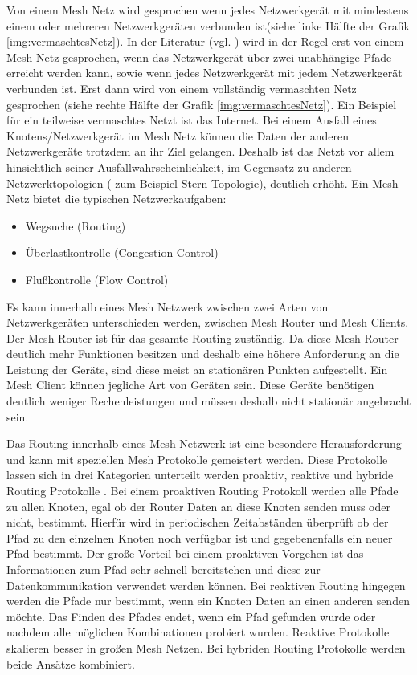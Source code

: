 Von einem Mesh Netz wird gesprochen wenn jedes Netzwerkgerät mit mindestens einem oder mehreren Netzwerkgeräten verbunden ist(siehe linke Hälfte der Grafik \ref{img:vermaschtesNetz}). In der Literatur (vgl. \cite{ conrads2013datenkommunikation}) wird in der Regel erst von einem Mesh Netz gesprochen, wenn das Netzwerkgerät über zwei unabhängige Pfade erreicht werden kann, sowie  wenn jedes Netzwerkgerät mit jedem Netzwerkgerät verbunden ist.  Erst dann wird von einem vollständig vermaschten Netz gesprochen (siehe rechte Hälfte der Grafik \ref{img:vermaschtesNetz}). Ein Beispiel für ein teilweise vermaschtes Netzt ist das Internet. 
Bei einem Ausfall eines Knotens/Netzwerkgerät im Mesh Netz können die Daten der anderen Netzwerkgeräte trotzdem an ihr Ziel gelangen. Deshalb ist das Netzt vor allem hinsichtlich seiner Ausfallwahrscheinlichkeit, im Gegensatz zu anderen Netzwerktopologien ( zum Beispiel Stern-Topologie), deutlich erhöht. 
Ein Mesh Netz bietet die typischen Netzwerkaufgaben:
\begin{itemize}
	\item Wegsuche (Routing)
	\item Überlastkontrolle (Congestion Control)
	\item Flußkontrolle (Flow Control)
\end{itemize}
Es kann innerhalb eines Mesh Netzwerk zwischen zwei Arten von Netzwerkgeräten unterschieden werden, zwischen Mesh Router und Mesh Clients. Der Mesh Router ist für das gesamte Routing zuständig. Da diese Mesh Router deutlich mehr Funktionen besitzen und deshalb eine höhere Anforderung an die Leistung der  Geräte, sind diese meist an stationären Punkten aufgestellt. Ein Mesh Client können jegliche Art von Geräten sein. Diese Geräte benötigen deutlich weniger Rechenleistungen und müssen deshalb nicht stationär angebracht sein.


Das Routing innerhalb eines Mesh Netzwerk ist eine besondere Herausforderung und kann mit speziellen Mesh Protokolle gemeistert werden. Diese Protokolle lassen sich in drei Kategorien unterteilt werden proaktiv, reaktive und hybride Routing Protokolle \cite{vijayakumar2012review}. Bei einem proaktiven Routing Protokoll werden alle Pfade zu allen Knoten, egal ob der Router Daten an diese Knoten senden muss oder nicht, bestimmt. Hierfür wird in periodischen Zeitabständen überprüft ob der Pfad zu den einzelnen Knoten noch verfügbar ist und gegebenenfalls ein neuer Pfad bestimmt.  Der große Vorteil bei einem proaktiven Vorgehen ist das Informationen zum Pfad sehr schnell bereitstehen und diese zur Datenkommunikation verwendet werden können. Bei reaktiven Routing hingegen werden die Pfade nur bestimmt, wenn ein Knoten Daten an einen anderen senden möchte. Das Finden des Pfades endet, wenn ein Pfad gefunden wurde oder nachdem alle möglichen Kombinationen probiert wurden. Reaktive Protokolle skalieren besser in großen Mesh Netzen. Bei hybriden Routing Protokolle werden beide Ansätze kombiniert.

